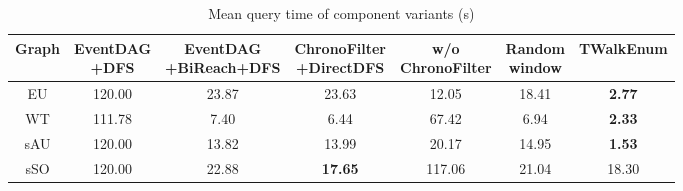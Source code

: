 \begin{table}[t]
\centering\fontsize{8}{9.6}\selectfont
\caption{Mean query time of component variants (s)}
\label{tab:ablation}
\begin{tabular}{ccccccc}
\hline
Graph & \shortstack{EventDAG\\+DFS} & \shortstack{EventDAG\\+BiReach+DFS} & \shortstack{ChronoFilter\\+DirectDFS} & \shortstack{w/o\\ChronoFilter} & \shortstack{Random\\window} & TWalkEnum \\
\hline
EU & 120.00 & 23.87 & 23.63 & 12.05 & 18.41 & \textbf{2.77} \\
WT & 111.78 & 7.40 & 6.44 & 67.42 & 6.94 & \textbf{2.33} \\
sAU & 120.00 & 13.82 & 13.99 & 20.17 & 14.95 & \textbf{1.53} \\
sSO & 120.00 & 22.88 & \textbf{17.65} & 117.06 & 21.04 & 18.30 \\
\hline
\end{tabular}
\end{table}

